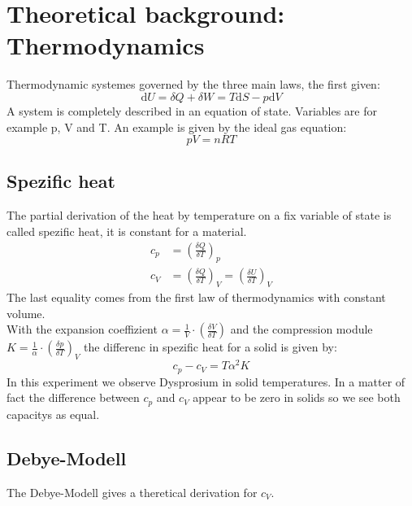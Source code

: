 \documentclass{include/thesisclass3}
\newcommand{\dd}{\text{d}}
\newcommand{\del}{\delta}
\begin{document}
	\FrontMatter
	
	\tableofcontents                  
	\newpage
	\MainMatter

\chapter{Theoretical background: Thermodynamics}
Thermodynamic systemes governed by the three main laws, the first given:
\begin{equation}
\dd U = \del Q + \del W = T\dd S - p \dd V
\end{equation} 
A system is completely described in an equation of state. Variables are for example p, V and T. An example is given by the ideal gas equation:
\begin{equation}
pV=nRT
\end{equation}
\section{Spezific heat}
The partial derivation of the heat by temperature on a fix variable of state is called spezific heat, it is constant for a material. 
\begin{align}
c_p &=\left(\frac{\del Q}{\del T}\right)_p\\
c_V &=\left(\frac{\del Q}{\del T}\right)_V = \left(\frac{\del U}{\del T}\right)_V\label{cv}
\end{align}
The last equality comes from the first law of thermodynamics with constant volume.\\
With the expansion coeffizient $\alpha = \frac{1}{V} \cdot \left(\frac{\del V}{\del T}\right)$ 
and the compression module $K=\frac{1}{\alpha}\cdot \left(\frac{\del p}{\del T}\right)_V$ 
the differenc in spezific heat for a solid is given by: 
\begin{equation}
c_p-c_V=T\alpha ^2 K
\end{equation}
In this experiment we observe Dysprosium in solid temperatures. In a matter of fact the difference between $c_p$ and $c_V$ appear to be zero in solids so we see both capacitys as equal.
\section{Debye-Modell}
The Debye-Modell gives a theretical derivation for $c_V$.
\end{document}
